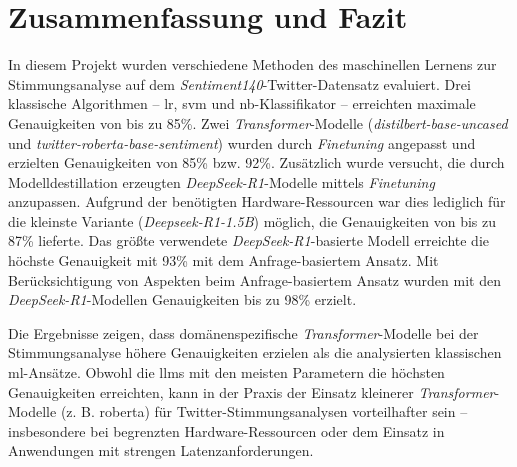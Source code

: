 \section{Zusammenfassung und Fazit}\label{sec:zusammenfassung-und-fazit}

In diesem Projekt wurden verschiedene Methoden des maschinellen Lernens zur Stimmungsanalyse auf dem \textit{Sentiment140}-Twitter-Datensatz evaluiert.
Drei klassische Algorithmen – \gls{lr}, \gls{svm} und \gls{nb}-Klassifikator – erreichten maximale Genauigkeiten von bis zu 85\%.
Zwei \textit{Transformer}-Modelle (\emph{distilbert-base-uncased} und \emph{twitter-roberta-base-sentiment}) wurden durch \textit{Finetuning} angepasst und erzielten Genauigkeiten von 85\% bzw. 92\%.
Zusätzlich wurde versucht, die durch Modelldestillation erzeugten \emph{DeepSeek-R1}-Modelle mittels \textit{Finetuning} anzupassen.
Aufgrund der benötigten Hardware-Res\-sour\-cen war dies lediglich für die kleinste Variante (\emph{Deepseek-R1-1.5B}) möglich, die Genauigkeiten von bis zu 87\% lieferte.
Das größte verwendete \emph{DeepSeek-R1}-basierte Modell erreichte die höchste Genauigkeit mit 93\% mit dem Anfrage-basiertem Ansatz.
Mit Berücksichtigung von Aspekten beim Anfrage-basiertem Ansatz wurden mit den \emph{DeepSeek-R1}-Modellen Genauigkeiten bis zu 98\% erzielt.

Die Ergebnisse zeigen, dass domänenspezifische \textit{Transformer}-Modelle bei der Stimmungsanalyse höhere Genauigkeiten erzielen als die analysierten klassischen \gls{ml}-Ansätze.
Obwohl die \glspl{llm} mit den meisten Parametern die höchsten Genauigkeiten erreichten, kann in der Praxis der Einsatz kleinerer \textit{Transformer}-Modelle (z. B. \gls{roberta}) für Twitter-Stimmungsanalysen vorteilhafter sein – insbesondere bei begrenzten Hardware-Ressourcen oder dem Einsatz in Anwendungen mit strengen Latenzanforderungen.
